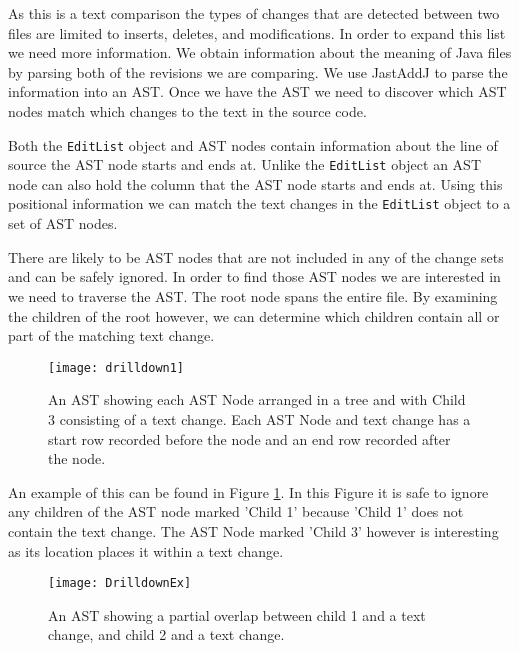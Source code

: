 As this is a text comparison the types of changes that are detected between two files are limited to inserts, deletes, and modifications. 
In order to expand this list we need more information.  
We obtain information about the meaning of Java files by parsing both of the revisions we are comparing.  
We use JastAddJ \cite{Oqvist2013} to parse the information into an AST. 
Once we have the AST we need to discover which AST nodes match which changes to the text in the source code.

\label{sec:over} 
Both the \lstinline{EditList} object and  AST nodes contain information about the line of source the AST node starts and ends at.  
Unlike the \lstinline{EditList} object an AST node can also hold the column that the AST node starts and ends at.  
Using this positional information we can match the text changes in the \lstinline{EditList} object to a set of AST nodes.

There are likely to be AST nodes that are not included in any of the change sets and can be safely ignored.
In order to find those AST nodes we are interested in we need to traverse the AST.
The root node spans the entire file. 
By examining the children of the root however, we can determine which children contain all or part of the matching text change.

\begin{figure}[!t]
 \begin{center}
  \texttt{[image: drilldown1]}
 \end{center}
 \caption{An AST showing each AST Node arranged in a tree and with Child 3 consisting of a text change.  Each AST Node and text change has a start row recorded before the node and an end row recorded after the node.}
 \label{fig:findingASTNode}
\end{figure}

An example of this can be found in Figure \ref{fig:findingASTNode}.  In this Figure it is safe to ignore any children of the AST node marked 'Child 1' because 'Child 1' does not contain the text change.  The AST Node marked 'Child 3' however is interesting as its location places it within a text change. 


\begin{figure}[!t]
 \begin{center}
  \texttt{[image: DrilldownEx]}
 \end{center}
 \caption{An AST showing a partial overlap between child 1 and a text change, and child 2 and a text change.}
 \label{fig:troubleASTNode}
\end{figure}

